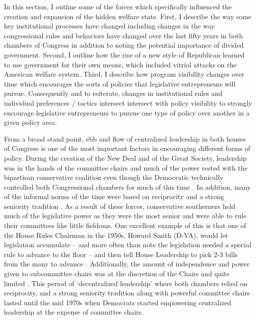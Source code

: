 \documentclass[12pt]{article}
\begin{document}
In this section, I outline some of the forces which specifically influenced the creation and expansion of the hidden welfare state. First, I describe the way some key institutional processes have changed including changes in the way congressional rules and behaviors have changed over the last fifty years in both chambers of Congress in addition to noting the potential importance of divided government. Second, I outline how the rise of a new style of Republican learned to use government for their own means, which included vitriol attacks on the American welfare system. Third, I describe how program visibility changes over time which encourages the sorts of policies that legislative entrepreneurs will pursue. Consequently and to reiterate, changes in institutional rules and individual preferences / tactics intersect intersect with policy visibility to strongly encourage legislative entrepreneurs to pursue one type of policy over another in a given policy area.

From a broad stand point, ebb and flow of centralized leadership in both houses of Congress is one of the most important factors in encouraging different forms of policy. During the creation of the New Deal and of the Great Society, leadership was in the hands of the committee chairs and much of the power rested with the bipartisan conservative coalition even though the Democratic technically controlled both Congressional chambers for much of this time \citep{shepsle1989, polsby2004}. In addition, many of the informal norms of the time were based on reciprocity and a strong seniority tradition \citep{matthews1960, asher1973}. As a result of these forces, conservative southerners held much of the legislative power as they were the most senior and were able to rule their committees like little fiefdoms. One excellent example of this is that one of the House Rules Chairman in the 1950s, Howard Smith (D-VA), would let legislation accumulate -- and more often than note the legislation needed a special rule to advance to the floor -- and then tell House Leadership to pick 2-3 bills from the many to advance \cite[pg. 14]{polsby2004}. Additionally, the amount of independence and power given to subcommittee chairs was at the discretion of the Chairs and quite limited \citep{rohde1974}. This period of `decentralized leadership' where both chambers relied on reciprocity, and a strong seniority tradition along with powerful committee chairs lasted until the mid 1970s when Democrats started empowering centralized leadership at the expense of committee chairs.
\end{document}
